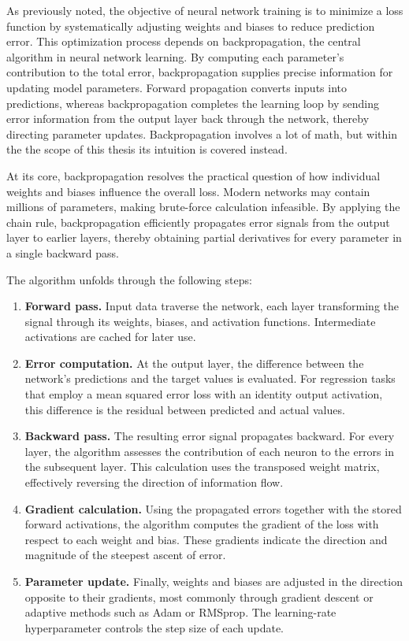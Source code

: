 

As previously noted, the objective of neural network training is to minimize a loss function by systematically adjusting weights and biases to reduce prediction error. This optimization process depends on backpropagation, the central algorithm in neural network learning. By computing each parameter's contribution to the total error, backpropagation supplies precise information for updating model parameters. Forward propagation converts inputs into predictions, whereas backpropagation completes the learning loop by sending error information from the output layer back through the network, thereby directing parameter updates. Backpropagation involves a lot of math, but within the the scope of this thesis its intuition is covered instead.

At its core, backpropagation resolves the practical question of how individual weights and biases influence the overall loss. Modern networks may contain millions of parameters, making brute-force calculation infeasible. By applying the chain rule, backpropagation efficiently propagates error signals from the output layer to earlier layers, thereby obtaining partial derivatives for every parameter in a single backward pass.

The algorithm unfolds through the following steps:

\begin{enumerate}
  \item \textbf{Forward pass.} Input data traverse the network, each layer transforming the signal through its weights, biases, and activation functions. Intermediate activations are cached for later use.
  \item \textbf{Error computation.} At the output layer, the difference between the network's predictions and the target values is evaluated. For regression tasks that employ a mean squared error loss with an identity output activation, this difference is the residual between predicted and actual values.
  \item \textbf{Backward pass.} The resulting error signal propagates backward. For every layer, the algorithm assesses the contribution of each neuron to the errors in the subsequent layer. This calculation uses the transposed weight matrix, effectively reversing the direction of information flow.
  \item \textbf{Gradient calculation.} Using the propagated errors together with the stored forward activations, the algorithm computes the gradient of the loss with respect to each weight and bias. These gradients indicate the direction and magnitude of the steepest ascent of error.
  \item \textbf{Parameter update.} Finally, weights and biases are adjusted in the direction opposite to their gradients, most commonly through gradient descent or adaptive methods such as Adam or RMSprop. The learning-rate hyperparameter controls the step size of each update.
\end{enumerate}


